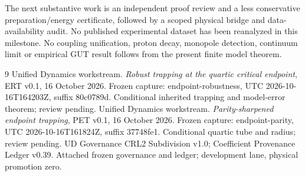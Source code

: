 \documentclass[11pt,a4paper]{article}
\begin{document}
The next substantive work is an independent proof review and a less conservative preparation/energy certificate, followed by a scoped physical bridge and data-availability audit. No published experimental dataset has been reanalyzed in this milestone. No coupling unification, proton decay, monopole detection, continuum limit or empirical GUT result follows from the present finite model theorem.

\begin{thebibliography}{9}
 Unified Dynamics workstream. \emph{Robust trapping at the quartic critical endpoint}, ERT v0.1, 16 October 2026. Frozen capture: endpoint-robustness, UTC 2026-10-16T164203Z, suffix 80c0789d. Conditional inherited trapping and model-error theorem; review pending.
 Unified Dynamics workstream. \emph{Parity-sharpened endpoint trapping}, PET v0.1, 16 October 2026. Frozen capture: endpoint-parity, UTC 2026-10-16T161824Z, suffix 37748fe1. Conditional quartic tube and radius; review pending.
 UD Governance CRL2 Subdivision v1.0; Coefficient Provenance Ledger v0.39. Attached frozen governance and ledger; development lane, physical promotion zero.
\end{thebibliography}
\end{document}
